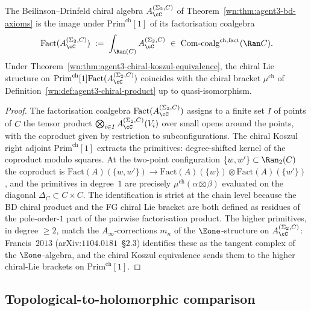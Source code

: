 \begin{proposition}
\label{wn:prop:agent3-as-chiral-lie}
\ClaimStatusProvedHere
The Beilinson--Drinfeld chiral algebra $A^{(\Sigma_2,C)}_\cC$ of Theorem~\ref{wn:thm:agent3-bd-axioms} is the image under $\mathrm{Prim}^{\mathrm{ch}}[1]$ of its factorisation coalgebra
\[
 \mathrm{Fact}(A^{(\Sigma_2,C)}_\cC)
 \;:=\;
 \int_{\Ran(C)}A^{(\Sigma_2,C)}_\cC
 \;\in\;
 \mathrm{Com}\text{-}\mathrm{coalg}^{\mathrm{ch,fact}}(\Ran C).
\]
Under Theorem~\ref{wn:thm:agent3-chiral-koszul-equivalence}, the chiral Lie structure on $\mathrm{Prim}^{\mathrm{ch}}[1]\mathrm{Fact}(A^{(\Sigma_2,C)}_\cC)$ coincides with the chiral bracket $\mu^{\mathrm{ch}}$ of Definition~\ref{wn:def:agent3-chiral-product} up to quasi-isomorphism.
\end{proposition}

\begin{proof}
The factorisation coalgebra $\mathrm{Fact}(A^{(\Sigma_2,C)}_\cC)$ assigns to a finite set $I$ of points of $C$ the tensor product $\bigotimes_{i\in I}A^{(\Sigma_2,C)}_\cC(V_i)$ over small opens around the points, with the coproduct given by restriction to subconfigurations. The chiral Koszul right adjoint $\mathrm{Prim}^{\mathrm{ch}}[1]$ extracts the primitives: degree-shifted kernel of the coproduct modulo squares. At the two-point configuration $\{w,w'\}\subset\Ran_2(C)$ the coproduct is $\mathrm{Fact}(A)(\{w,w'\})\to\mathrm{Fact}(A)(\{w\})\otimes\mathrm{Fact}(A)(\{w'\})$, and the primitives in degree~$1$ are precisely $\mu^{\mathrm{ch}}(\alpha\boxtimes\beta)$ evaluated on the diagonal $\Delta_C\subset C\times C$. The identification is strict at the chain level because the BD chiral product and the FG chiral Lie bracket are both defined as residues of the pole-order-$1$ part of the pairwise factorisation product. The higher primitives, in degree $\geq 2$, match the $A_\infty$-corrections $m_n$ of the $\Eone$-structure on $A^{(\Sigma_2,C)}_\cC$: Francis~$2013$ (arXiv:$1104.0181$~\S$2.3$) identifies these as the tangent complex of the $\Eone$-algebra, and the chiral Koszul equivalence sends them to the higher chiral-Lie brackets on $\mathrm{Prim}^{\mathrm{ch}}[1]$.
\end{proof}

\subsection{Topological-to-holomorphic comparison}
\label{wn:subsec:agent3-topological-holomorphic}

